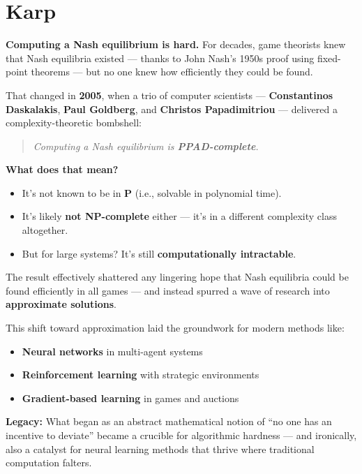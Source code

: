 \section{Karp}




\begin{tcolorbox}[colback=gray!5!white, colframe=black, title=\textbf{Sidebar: When Nash Met Complexity Theory (2005)}]

    \textbf{Computing a Nash equilibrium is hard.} For decades, game theorists knew that Nash equilibria existed — thanks to John Nash’s 1950s proof using fixed-point theorems — but no one knew how efficiently they could be found.
    
    That changed in \textbf{2005}, when a trio of computer scientists — \textbf{Constantinos Daskalakis}, \textbf{Paul Goldberg}, and \textbf{Christos Papadimitriou} — delivered a complexity-theoretic bombshell: 
    
    \begin{quote}
    \textit{Computing a Nash equilibrium is \textbf{PPAD-complete}.}
    \end{quote}
    
    \vspace{0.5em}
    
    \textbf{What does that mean?}
    \begin{itemize}
        \item It's not known to be in \textbf{P} (i.e., solvable in polynomial time).
        \item It's likely \textbf{not NP-complete} either — it's in a different complexity class altogether.
        \item But for large systems? It's still \textbf{computationally intractable}.
    \end{itemize}
    
    The result effectively shattered any lingering hope that Nash equilibria could be found efficiently in all games — and instead spurred a wave of research into \textbf{approximate solutions}. 
    
    This shift toward approximation laid the groundwork for modern methods like:
    \begin{itemize}
        \item \textbf{Neural networks} in multi-agent systems
        \item \textbf{Reinforcement learning} with strategic environments
        \item \textbf{Gradient-based learning} in games and auctions
    \end{itemize}
    
    \vspace{0.5em}
    
    \textbf{Legacy:} What began as an abstract mathematical notion of “no one has an incentive to deviate” became a crucible for algorithmic hardness — and ironically, also a catalyst for neural learning methods that thrive where traditional computation falters.
    
\end{tcolorbox}
